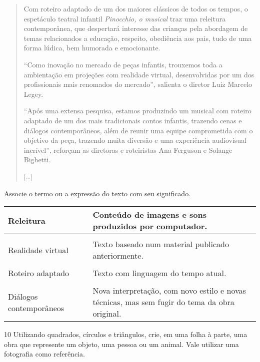 \begin{quote}
Com roteiro adaptado de um dos maiores clássicos de todos os tempos, o
espetáculo teatral infantil \textit{Pinocchio, o musical} traz uma releitura
contemporânea, que despertará interesse das crianças pela abordagem de
temas relacionados a educação, respeito, obediência aos pais, tudo de
uma forma lúdica, bem humorada e emocionante.

“Como inovação no mercado de peças infantis, trouxemos toda a
ambientação em projeções com realidade virtual, desenvolvidas por um dos
profissionais mais renomados do mercado”, salienta o diretor Luiz
Marcelo Legey.

“Após uma extensa pesquisa, estamos produzindo um musical com roteiro
adaptado de um dos mais tradicionais contos infantis, trazendo cenas e
diálogos contemporâneos, além de reunir uma equipe comprometida com o
objetivo da peça, trazendo muita diversão e uma experiência audiovisual
incrível”, reforçam as diretoras e roteiristas Ana Ferguson e Solange
Bighetti.

{[}\ldots{}{]}

\end{quote}

Associe o termo ou a expressão do texto com seu significado.

\begin{longtable}[]{@{}lll@{}}
\toprule
Releitura & & Conteúdo de imagens e sons produzidos por
computador.\tabularnewline
\midrule
\endhead
& &\tabularnewline
Realidade virtual & & Texto baseado num material publicado
anteriormente.\tabularnewline
& &\tabularnewline
Roteiro adaptado & & Texto com linguagem do tempo atual.\tabularnewline
& &\tabularnewline
Diálogos contemporâneos & & Nova interpretação, com novo estilo e novas
técnicas, mas sem fugir do tema da obra original.\tabularnewline
\bottomrule
\end{longtable}


\num{10} Utilizando quadrados, círculos e triângulos, crie, em uma folha à parte,
uma obra que represente um objeto, uma pessoa ou um animal. Vale utilizar uma fotografia como referência.

